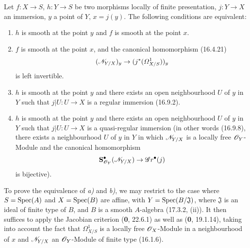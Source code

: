\begin{theorem}[17.12.1]
\label{IV.17.12.1}
Let $f:X\to S$, $h:Y\to S$ be two morphisms locally of finite presentation, $j:Y\to X$ an immersion, $y$ a point of $Y$, $x=j(y)$. The following conditions are equivalent:
\begin{enumerate}
  \item[\textup{a)}] $h$ is smooth at the point $y$ and $f$ is smooth at the point $x$.
  \item[\textup{b)}] $f$ is smooth at the point $x$, and the canonical homomorphism \textup{(16.4.21)}
  \[
  (\mathscr{N}_{Y/X})_y\to(j^*(\varOmega^1_{X/S}))_y
  \]
  is left invertible.
  \item[\textup{c)}] $h$ is smooth at the point $y$ and there exists an open neighbourhood $U$ of $y$ in $Y$ such that $j|U:U\to X$ is a regular immersion \textup{(16.9.2)}.


  \item[\textup{c$'$)}] $h$ is smooth at the point $y$ and there exists an open neighbourhood $U$ of $y$ in $Y$ such that $j|U:U\to X$ is a quasi-regular immersion \textup{(in other words (16.9.8), there exists a neighbourhood $U$ of $y$ in $Y$ in which $\mathscr{N}_{Y/X}$ is a locally free $\mathscr{O}_Y$-Module and the canonical homomorphism
  \[
  \mathbf{S}^{\bullet}_{\mathscr{O}_Y}(\mathscr{N}_{Y/X})\to\mathscr{G}r^{\bullet}(j)
  \]
  is bijective)}.
\end{enumerate}
\end{theorem}

To prove the equivalence of \emph{a)} and \emph{b)}, we may restrict to the case where $S=\operatorname{Spec}(A)$ and $X=\operatorname{Spec}(B)$ are affine, with $Y=\operatorname{Spec}(B/\mathfrak J)$, where $\mathfrak J$ is an ideal of finite type of $B$, and $B$ is a smooth $A$-algebra (17.3.2, (ii)). It then suffices to apply the Jacobian criterion (\textbf{0}, 22.6.1) as well as (\textbf{0}, 19.1.14), taking into account the fact that $\varOmega^1_{X/S}$ is a locally free $\mathscr{O}_X$-Module in a neighbourhood of $x$ and $\mathscr{N}_{Y/X}$ an $\mathscr{O}_Y$-Module of finite type (16.1.6).

